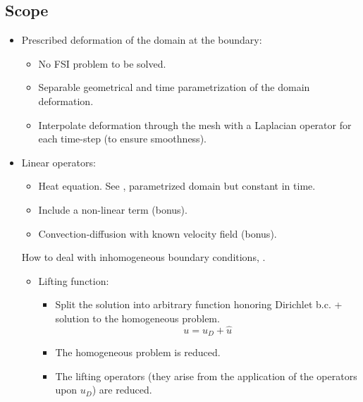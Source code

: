 \documentclass[thesis.tex]{subfiles}
\begin{document}
\subsection*{Scope}
\begin{itemize}
    \item Prescribed deformation of the domain at the boundary:
    \begin{itemize}
        \item No FSI problem to be solved.
        \item Separable geometrical and time parametrization of the domain deformation.
        \item Interpolate deformation through the mesh with a Laplacian operator for each time-step (to ensure smoothness).
    \end{itemize}
    \item Linear operators:
    \begin{itemize}
        \item Heat equation. See \cite{2009_reducedBasisMethodsAPosterioriErrorEstimatorsHeatTransferProblems_Rozza}, parametrized domain but constant in time.
        \item Include a non-linear term (bonus). 
        \item Convection-diffusion with known velocity field (bonus). 
    \end{itemize}

    How to deal with inhomogeneous boundary conditions, \cite{2007_ReducedOrderModelingTimeDependentPDEsMultipleParametersBoundaryData_gunzburger}.
    \begin{itemize}
        \item Lifting function:
        \begin{itemize}
            \item Split the solution into arbitrary function honoring Dirichlet b.c. + solution to the homogeneous problem.
            \begin{equation*}
                u = u_D + \hat{u}
            \end{equation*}
            \item The homogeneous problem is reduced.
            \item The lifting operators (they arise from the application of the operators upon $u_D$) are reduced. 
        \end{itemize}
    \end{itemize}

\end{itemize}
\end{document}

